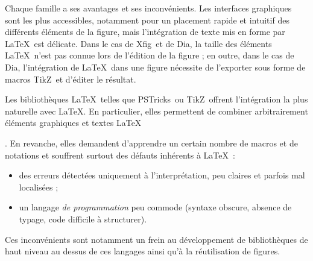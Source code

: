 \documentclass[twoside]{studia-Hermann}
\newcommand{\nomdetikz}{\textsf{TikZ}}
\newcommand{\pstricks}{\textsf{PSTricks}}
\newcommand{\dia}{\textsf{Dia}}
\newcommand{\xfig}{\textsf{Xfig}}
\begin{document}

Chaque famille a ses avantages et ses inconvénients. Les interfaces
graphiques sont les plus accessibles, notamment pour un placement
rapide et intuitif des différents éléments de la figure, mais
l'intégration de texte mis en forme par \LaTeX\ est délicate. Dans le
cas de \xfig\ et de \dia, la taille des éléments \LaTeX\ n'est pas
connue lors de l'édition de la figure ; en outre, dans le cas de \dia,
l'intégration de \LaTeX\ dans une figure nécessite de l'exporter sous
forme de macros \nomdetikz\ et d'éditer le résultat.

Les bibliothèques \LaTeX\ telles que \pstricks\ ou \nomdetikz\ offrent
l'intégration la plus naturelle avec \LaTeX. En particulier, elles
permettent de combiner arbitrairement éléments graphiques et textes
\LaTeX\ 
.
En revanche, elles demandent d'apprendre un certain nombre de
macros et de notations et souffrent surtout des défauts inhérents à
\LaTeX~:
\begin{itemize}
\item des erreurs détectées uniquement à l'interprétation, peu claires
  et parfois mal localisées ;
\item un langage \emph{de programmation} peu commode (syntaxe obscure,
  absence de typage, code difficile à structurer).
\end{itemize}
Ces inconvénients sont notamment un frein au développement de
bibliothèques de haut niveau au dessus de ces langages ainsi qu'à la
réutilisation de figures.
\end{document}
